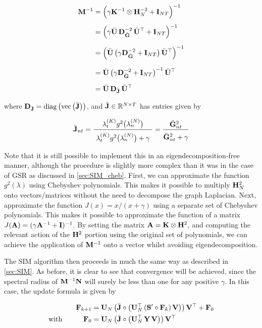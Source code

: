 \begin{align}
    \label{eq:M_inv_kgr}
    \mathbf{M}^{-1} &= \Big(\gamma \mathbf{K}^{-1} \otimes \mathbf{H}_N^{-2} + \mathbf{I}_{NT}\Big)^{-1} \notag \\[0.15cm]
    &= \Big(\gamma \bar{\mathbf{U}} \, \mathbf{D}_{\bar{\mathbf{G}}}^{-2} \, \bar{\mathbf{U}}^\top + \mathbf{I}_{NT}\Big)^{-1} \notag \\[0.2cm]
    &= \Big(\bar{\mathbf{U}} \, \big( \gamma \mathbf{D}_{\bar{\mathbf{G}}}^{-2} + \mathbf{I}_{NT} \big) \, \bar{\mathbf{U}}^\top\Big)^{-1} \notag \\[0.25cm]
    &= \bar{\mathbf{U}} \, \big( \gamma \mathbf{D}_{\bar{\mathbf{G}}}^{-2} + \mathbf{I}_{NT} \big)^{-1} \, \bar{\mathbf{U}}^\top \notag \\[0.2cm]
    &= \bar{\mathbf{U}} \, \mathbf{D}_{\bar{\mathbf{J}}} \, \bar{\mathbf{U}}^\top 
\end{align}

where $\mathbf{D}_{\bar{\mathbf{J}}} = \text{\textup{diag}}\left(\text{\textup{vec}}\left(\bar{\mathbf{J}}\right)\right)$, and $\bar{\mathbf{J}} \in \mathbb{R}^{N \times T}$ has entries given by 

\begin{equation}
    \label{eq:Jnt2}
    \bar{\J}_{nt} = \frac{\lambda^{(K)}_t g^2\big(\lambda_n^{(N)}\big)}{ \raisebox{-0.2cm} { $\lambda^{(K)}_t g^2\big(\lambda_n^{(N)}\big) + \gamma$ } } = \frac{\bar{\G}_{nt}^2}{ \raisebox{-0.15cm} {$\bar{\G}_{nt}^2 + \gamma$}}
\end{equation}

Note that it is still possible to implement this in an eigendecomposition-free manner, although the procedure is slightly more complex than it was in the case of GSR as discussed in \cref{sec:SIM_cheb}. First, we can approximate the function $g^2(\lambda)$ using Chebyshev polynomials. This makes it possible to multiply $\mathbf{H}_N^2$ onto vectors/matrices without the need to decompose the graph Laplacian. Next, approximate the function $J(x) = x/(x+\gamma)$ using a separate set of Chebyshev polynomials. This makes it possible to approximate the function of a matrix $J(\mathbf{A}) = (\gamma \mathbf{A}^{-1} + \mathbf{I})^{-1}$. By setting the matrix $\mathbf{A} = \mathbf{K} \otimes \mathbf{H}^2$, and computing the relevant action of the $\mathbf{H}^2$ portion using the original set of polynomials, we can achieve the application of $\mathbf{M}^{-1}$ onto a vector whilst avoiding eigendecomposition. 

The SIM algorithm then proceeds in much the same way as described in \cref{sec:SIM}. As before, it is clear to see that convergence will be achieved, since the spectral radius of $\mathbf{M}^{-1}\mathbf{N}$ will surely be less than one for any positive $\gamma$. In this case, the update formula is given by 

\begin{align}
    \label{eq:update_sim_kgr}
    \mathbf{F}_{k+1} & = \mathbf{U}_N \, \big( \bar{\mathbf{J}}  \circ \big( \mathbf{U}_N^\top \, (\mathbf{S}' \circ \mathbf{F}_{k})\, \mathbf{V} \big) \big) \, \mathbf{V}^\top + \mathbf{F}_0 \\
    \label{eq:update_sim_kgr2}
    \text{with} \quad\quad\quad \mathbf{F}_0 & = \mathbf{U}_N \, \big( \bar{\mathbf{J}}  \circ \big( \mathbf{U}_N^\top \, \mathbf{Y} \, \mathbf{V} \big) \big) \, \mathbf{V}^\top 
\end{align}

